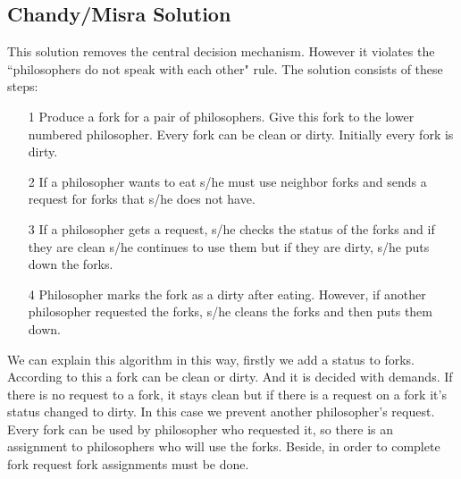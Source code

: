 \documentclass[12pt,a4paper]{report}
\begin{document}
 \subsection*{Chandy/Misra Solution}
 \begin{flushleft}
  This solution removes the central decision mechanism. However it violates the ``philosophers do not speak with each other" 
  rule. The solution consists of these steps:
  \begin{itemize}
   \item[1] Produce a fork for a pair of philosophers. Give this fork to the lower numbered philosopher. Every fork can 
   be clean or dirty. Initially every fork is dirty.
   \item[2] If a philosopher wants to eat s/he must use neighbor forks and sends a request for forks that s/he does not have.
   \item[3] If a philosopher gets a request, s/he checks the status of the forks and if they are clean s/he continues 
   to use them but if they are dirty, s/he puts down the forks.
   \item[4] Philosopher marks the fork as a dirty after eating. However, if another philosopher requested the forks, s/he 
   cleans the forks and then puts them down.
  \end{itemize}
  We can explain this algorithm in this way, firstly we add a status to forks. According to this a fork can be clean or dirty. And it is 
  decided with demands. If there is no request to a fork, it stays clean but if there is a request on a fork it's status 
  changed to dirty. In this case we prevent another philosopher's request. Every fork can be used by philosopher who requested 
  it, so there is an assignment to philosophers who will use the forks. Beside, in order to complete fork request fork assignments 
  must be done. 
 \end{flushleft}
 \pagebreak
 
\end{document}
